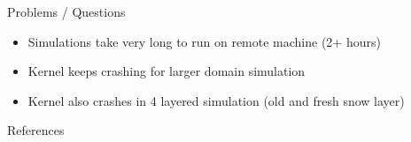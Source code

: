\documentclass[11pt,aspectratio=169]{beamer}
\begin{document}
\begin{frame}{Problems / Questions}
    \begin{itemize}
        \item Simulations take very long to run on remote machine (2+ hours)
        \item Kernel keeps crashing for larger domain simulation
        \item Kernel also crashes in 4 layered simulation (old and fresh snow layer)
    \end{itemize}
    
\end{frame}


\begin{frame}{References}
    \printbibliography
    
\end{frame}


	
	
	
	




	
		
	
	
\end{document}
